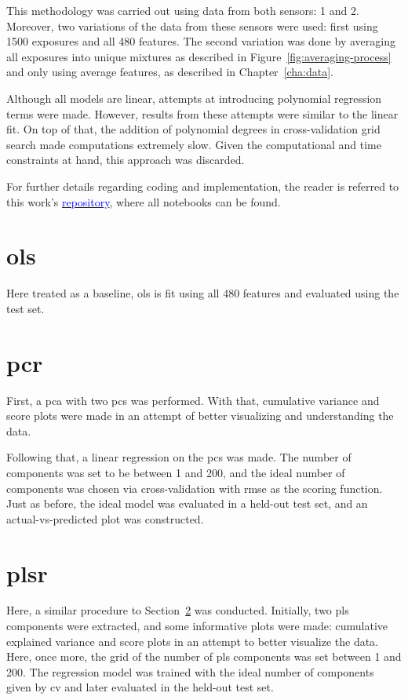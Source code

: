 This methodology was carried out using data from both sensors: 1 and 2. Moreover, two variations of the data from these sensors were used: first using 1500 exposures and all 480 features. The second variation was done by averaging all exposures into unique mixtures as described in Figure~\ref{fig:averaging-process} and only using average features, as described in Chapter~\ref{cha:data}.

Although all models are linear, attempts at introducing polynomial regression terms were made. However, results from these attempts were similar to the linear fit. On top of that, the addition of polynomial degrees in cross-validation grid search made computations extremely slow. Given the computational and time constraints at hand, this approach was discarded.

For further details regarding coding and implementation, the reader is referred to this work's \href{https://github.com/cosmourao/thesis}{\textcolor{blue}{repository}}, where all notebooks can be found.

\section{\acrlong{ols}}
\label{sec:met-ols}

Here treated as a baseline, \acrshort{ols} is fit using all 480 features and evaluated using the test set. 

\section{\acrlong{pcr}}
\label{sec:met-pcr}

First, a \acrshort{pca} with two \acrshort{pc}s was performed. With that, cumulative variance and score plots were made in an attempt of better visualizing and understanding the data.

Following that, a linear regression on the \acrshort{pc}s was made. The number of components was set to be between 1 and 200, and the ideal number of components was chosen via cross-validation with \acrshort{rmse} as the scoring function. Just as before, the ideal model was evaluated in a held-out test set, and an actual-vs-predicted plot was constructed.

\section{\acrlong{plsr}}
\label{sec:met-plsr}

Here, a similar procedure to Section~\ref{sec:met-pcr} was conducted. Initially, two \acrshort{pls} components were extracted, and some informative plots were made: cumulative explained variance and score plots in an attempt to better visualize the data. Here, once more, the grid of the number of \acrshort{pls} components was set between 1 and 200. The regression model was trained with the ideal number of components given by \acrshort{cv} and later evaluated in the held-out test set.

